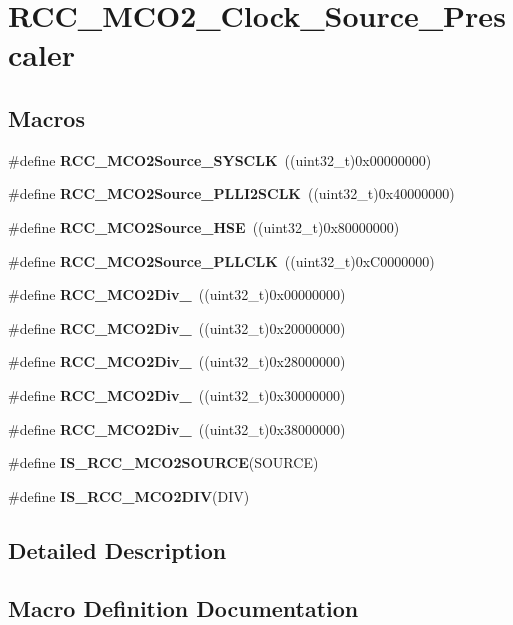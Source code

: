 \section{R\+C\+C\+\_\+\+M\+C\+O2\+\_\+\+Clock\+\_\+\+Source\+\_\+\+Prescaler}
\label{group__RCC__MCO2__Clock__Source__Prescaler}
\subsection*{Macros}
\begin{DoxyCompactItemize}
\item 
\#define \textbf{ R\+C\+C\+\_\+\+M\+C\+O2\+Source\+\_\+\+S\+Y\+S\+C\+LK}~((uint32\+\_\+t)0x00000000)
\item 
\#define \textbf{ R\+C\+C\+\_\+\+M\+C\+O2\+Source\+\_\+\+P\+L\+L\+I2\+S\+C\+LK}~((uint32\+\_\+t)0x40000000)
\item 
\#define \textbf{ R\+C\+C\+\_\+\+M\+C\+O2\+Source\+\_\+\+H\+SE}~((uint32\+\_\+t)0x80000000)
\item 
\#define \textbf{ R\+C\+C\+\_\+\+M\+C\+O2\+Source\+\_\+\+P\+L\+L\+C\+LK}~((uint32\+\_\+t)0x\+C0000000)
\item 
\#define \textbf{ R\+C\+C\+\_\+\+M\+C\+O2\+Div\+\_}~((uint32\+\_\+t)0x00000000)
\item 
\#define \textbf{ R\+C\+C\+\_\+\+M\+C\+O2\+Div\+\_}~((uint32\+\_\+t)0x20000000)
\item 
\#define \textbf{ R\+C\+C\+\_\+\+M\+C\+O2\+Div\+\_}~((uint32\+\_\+t)0x28000000)
\item 
\#define \textbf{ R\+C\+C\+\_\+\+M\+C\+O2\+Div\+\_}~((uint32\+\_\+t)0x30000000)
\item 
\#define \textbf{ R\+C\+C\+\_\+\+M\+C\+O2\+Div\+\_}~((uint32\+\_\+t)0x38000000)
\item 
\#define \textbf{ I\+S\+\_\+\+R\+C\+C\+\_\+\+M\+C\+O2\+S\+O\+U\+R\+CE}(S\+O\+U\+R\+CE)
\item 
\#define \textbf{ I\+S\+\_\+\+R\+C\+C\+\_\+\+M\+C\+O2\+D\+IV}(D\+IV)
\end{DoxyCompactItemize}


\subsection{Detailed Description}


\subsection{Macro Definition Documentation}
\mbox{\label{group__RCC__MCO2__Clock__Source__Prescaler_gab28570d78a518bc83f82a96e7b0b8a73}} 
